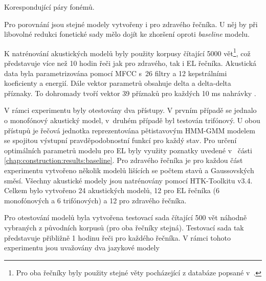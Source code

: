 \begin{table}[htpb]
  \centering
  \def\arraystretch{1.5}
  \caption{Korespondující páry fonémů.}
  \label{tab:construction:reduction:pairs}
\end{table}

\noindent Pro porovnání jsou stejné modely vytvořeny i pro zdravého řečníka.
U něj by při libovolné redukci fonetické sady mělo dojít ke zhoršení oproti \textit{baseline} modelu.

K natrénování akustických modelů byly použity korpusy čítající 5000 vět\footnote{Pro oba řečníky byly použity stejné věty pocházející z databáze popsané v~\cite{Radova2000}.}, což představuje více než 10 hodin řeči jak pro zdravého, tak i EL řečníka.
Akustická data byla parametrizována pomocí MFCC s~26 filtry a 12 kepstrálními koeficienty a energií.
Dále vektor parametrů obsahuje delta a delta-delta příznaky.
To dohromady tvoří vektor 39 příznaků pro každých 10 ms nahrávky \cite{Psutka2007}.

V rámci experimentu byly otestovány dva přístupy.
V prvním případě se jednalo o monofónový akustický model, v~druhém případě byl testován trifónový.
U obou přístupů je řečová jednotka reprezentována pětistavovým HMM-GMM modelem se spojitou výstupní pravděpodobnostní funkcí pro každý stav.
Pro určení optimálních parametrů modelu pro EL byly využity poznatky uvedené v~ části \ref{chap:construction:results:baseline}.
Pro zdravého řečníka je pro každou část experimentu vytvořeno několik modelů lišících se počtem stavů a Gaussovských směsí.
Všechny akustické modely jsou natrénovány pomocí HTK-Toolkitu v3.4.
Celkem bylo vytvořeno 24 akustických modelů, 12 pro EL řečníka (6 monofónových a 6 trifónových) a 12 pro zdravého řečníka.

Pro otestování modelů byla vytvořena testovací sada čítající 500 vět náhodně vybraných z původních korpusů (pro oba řečníky stejná).
Testovací sada tak představuje přibližně 1 hodinu řeči pro každého řečníka.
V rámci tohoto experimentu jsou uvažovány dva jazykové modely

